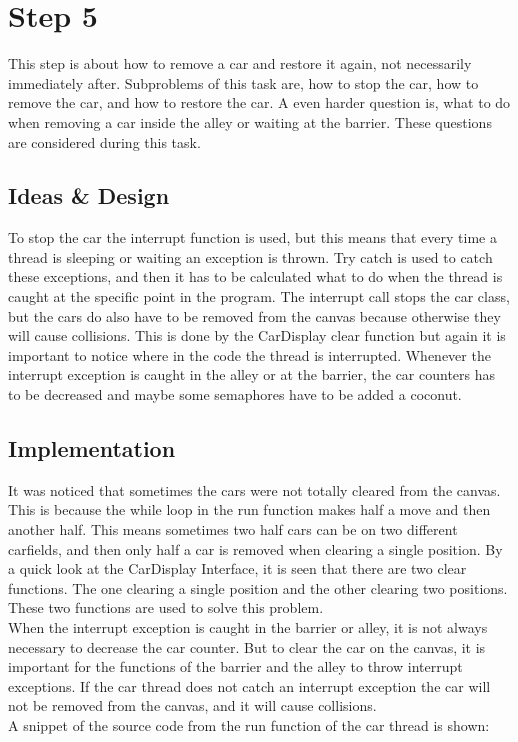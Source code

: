 \section{Step 5}
This step is about how to remove a car and restore it again, not necessarily immediately after. Subproblems of this task are, how to stop the car, how to remove the car, and how to restore the car. A even harder question is, what to do when removing a car inside the alley or waiting at the barrier. These questions are considered during this task.

\subsection{Ideas \& Design}
To stop the car the interrupt function is used, but this means that every time a thread is sleeping or waiting an exception is thrown. Try catch is used to catch these exceptions, and then it has to be calculated what to do when the thread is caught at the specific point in the program. The interrupt call stops the car class, but the cars do also have to be removed from the canvas because otherwise they will cause collisions. This is done by the CarDisplay clear function but again it is important to notice where in the code the thread is interrupted. Whenever the interrupt exception is caught in the alley or at the barrier, the car counters has to be decreased and maybe some semaphores have to be added a coconut.

\subsection{Implementation}
It was noticed that sometimes the cars were not totally cleared from the canvas. This is because the while loop in the run function makes half a move and then another half. This means sometimes two half cars can be on two different carfields, and then only half a car is removed when clearing a single position. By a quick look at the CarDisplay Interface, it is seen that there are two clear functions. The one clearing a single position and the other clearing two positions. These two functions are used to solve this problem.
\\

When the interrupt exception is caught in the barrier or alley, it is not always necessary to decrease the car counter. But to clear the car on the canvas, it is important for the functions of the barrier and the alley to throw interrupt exceptions. If the car thread does not catch an interrupt exception the car will not be removed from the canvas, and it will cause collisions. \\
A snippet of the source code from the run function of the car thread is shown:

